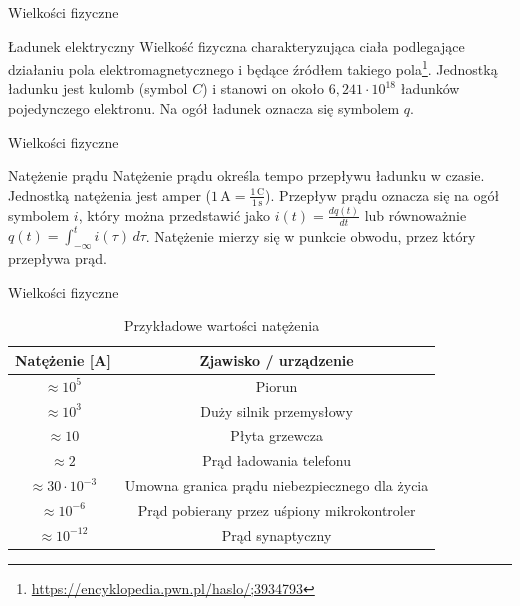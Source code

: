 
\begin{frame}{Wielkości fizyczne}
	\begin{block}{Ładunek elektryczny}
		Wielkość fizyczna charakteryzująca ciała podlegające działaniu pola elektromagnetycznego
		i będące źródłem takiego pola\footnote{\url{https://encyklopedia.pwn.pl/haslo/;3934793}}.
		Jednostką ładunku jest kulomb (symbol $C$) i stanowi on około $6{,}241 \cdot 10^{18}$ ładunków pojedynczego elektronu.
		Na ogół ładunek oznacza się symbolem $q$.
	\end{block}
\end{frame}

\begin{frame}{Wielkości fizyczne}
	\begin{block}{Natężenie prądu}
		Natężenie prądu określa tempo przepływu ładunku w czasie.
		Jednostką natężenia jest amper ($1\,\text{A} = \tfrac{1\,\text{C}}{1\,\text{s}}$).
		Przepływ prądu oznacza się na ogół symbolem $i$, który można przedstawić jako
		$i(t) = \tfrac{dq(t)}{dt}$ lub równoważnie $q(t) = \int_{-\infty}^{t} i(\tau)\, d\tau$.
		Natężenie mierzy się w punkcie obwodu, przez który przepływa prąd.
	\end{block}
\end{frame}

\begin{frame}{Wielkości fizyczne}
	\begin{table}
		\centering
		\caption{Przykładowe wartości natężenia}
		\begin{tabular}{|c|c|}
			\hline
			Natężenie [A]              & Zjawisko / urządzenie                          \\ \hline
			$\approx 10^{5}$           & Piorun                                         \\ \hline
			$\approx 10^{3}$           & Duży silnik przemysłowy                        \\ \hline
			$\approx 10$               & Płyta grzewcza                                 \\ \hline
			$\approx 2$                & Prąd ładowania telefonu                        \\ \hline
			$\approx 30 \cdot 10^{-3}$ & Umowna granica prądu niebezpiecznego dla życia \\ \hline
			$\approx 10^{-6}$          & Prąd pobierany przez uśpiony mikrokontroler    \\ \hline
			$\approx 10^{-12}$         & Prąd synaptyczny                               \\ \hline
		\end{tabular}
	\end{table}
\end{frame}


